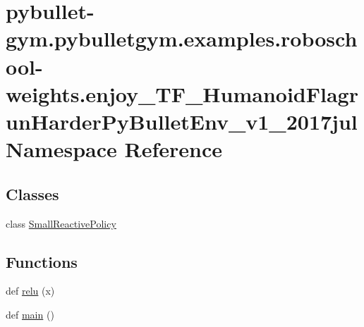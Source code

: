 \hypertarget{namespacepybullet-gym_1_1pybulletgym_1_1examples_1_1roboschool-weights_1_1enjoy___t_f___humanoid9dba9dbbc727c9140c0c88eec28e43d0}{}\section{pybullet-\/gym.pybulletgym.\+examples.\+roboschool-\/weights.enjoy\+\_\+\+T\+F\+\_\+\+Humanoid\+Flagrun\+Harder\+Py\+Bullet\+Env\+\_\+v1\+\_\+2017jul Namespace Reference}
\label{namespacepybullet-gym_1_1pybulletgym_1_1examples_1_1roboschool-weights_1_1enjoy___t_f___humanoid9dba9dbbc727c9140c0c88eec28e43d0}
\subsection*{Classes}
\begin{DoxyCompactItemize}
\item 
class \hyperlink{classpybullet-gym_1_1pybulletgym_1_1examples_1_1roboschool-weights_1_1enjoy___t_f___humanoid_flaa6bac9845e6a011d8d2dbf7d1f577e42}{Small\+Reactive\+Policy}
\end{DoxyCompactItemize}
\subsection*{Functions}
\begin{DoxyCompactItemize}
\item 
def \hyperlink{namespacepybullet-gym_1_1pybulletgym_1_1examples_1_1roboschool-weights_1_1enjoy___t_f___humanoid9dba9dbbc727c9140c0c88eec28e43d0_ae4cc34e852f5453bc5ad56ec4fc617ed}{relu} (x)
\item 
def \hyperlink{namespacepybullet-gym_1_1pybulletgym_1_1examples_1_1roboschool-weights_1_1enjoy___t_f___humanoid9dba9dbbc727c9140c0c88eec28e43d0_a4ccfd0edec99b26b0921c92cf429d5ab}{main} ()
\end{DoxyCompactItemize}
